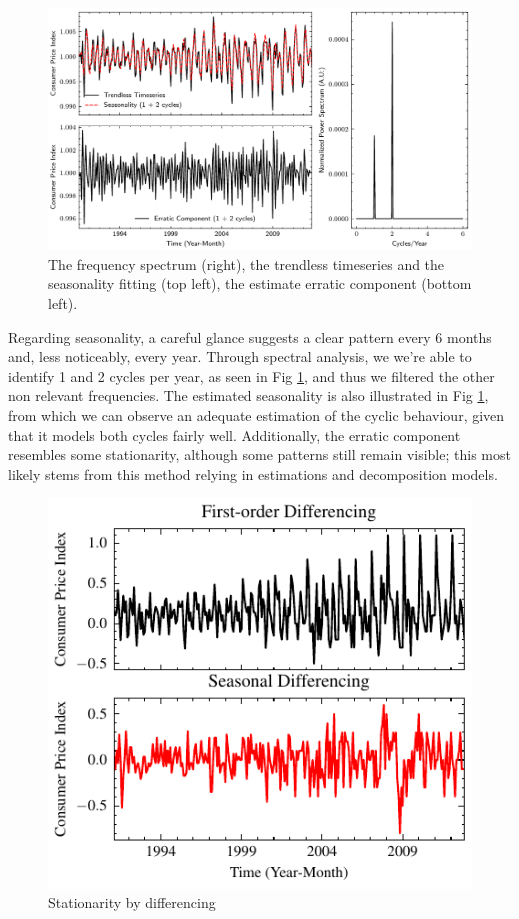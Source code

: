 \documentclass[conference]{IEEEtran}
\begin{document}
\begin{figure}[hbtp]
    \centering
    \includegraphics{../figs/season.pdf}
    \caption{The frequency spectrum (right), the trendless timeseries and the seasonality fitting (top left), the estimate erratic component (bottom left).}
    \label{fig:season}
\end{figure}


Regarding seasonality, a careful glance suggests a clear pattern every 6 months and, less noticeably, every year. Through spectral analysis, we we're able to identify 1 and 2 cycles per year, as seen in Fig \ref{fig:season}, and thus we filtered the other non relevant frequencies. The estimated seasonality is also illustrated in Fig \ref{fig:season}, from which we can observe an adequate estimation of the cyclic behaviour, given that it models both cycles fairly well. Additionally, the erratic component resembles some stationarity, although some patterns still remain visible; this most likely stems from this method relying in estimations and decomposition models.

\begin{figure}[hbtp]
    \centering
    \includegraphics{../figs/differencing.pdf}
    \caption{Stationarity by differencing}
    \label{fig:differencing}
\end{figure}
\end{document}
